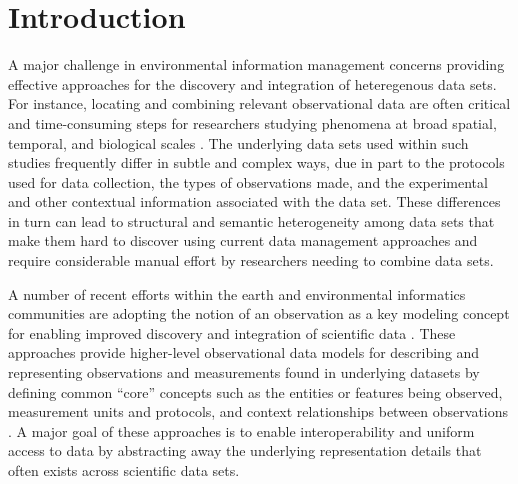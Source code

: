 
\section{Introduction}
\label{sec-intro}

A major challenge in environmental information management concerns
providing effective approaches for the discovery and integration of
heteregenous data sets. For instance, locating and combining relevant
observational data are often critical and time-consuming steps for
researchers studying phenomena at broad spatial, temporal, and
biological scales
\cite{worm06:_impac_of_biodiv_loss_ocean_ecosy_servic,pennings05:_do,green05:_compl_in_ecolog_and_conser,sorokina09:_detec_inter_variab_inter_obser_ornit_data,jackson01:_histor_overf_and_recen_collap}. The
underlying data sets used within such studies frequently differ in
subtle and complex ways, due in part to the protocols used for data
collection, the types of observations made, and the experimental and
other contextual information associated with the data set. These
differences in turn can lead to structural and semantic heterogeneity
among data sets that make them hard to discover using current data
management approaches and require considerable manual effort by
researchers needing to combine data sets.

A number of recent efforts within the earth and environmental
informatics communities are adopting the notion of an observation as a
key modeling concept for enabling improved discovery and integration
of scientific data
\cite{om,fox09:_ontol,tarboton07:_cuahs_commun_obser_data_model,cushing07:_compon_based_end_user_datab,balhoff10:_phenex,bowers08}. These
approaches provide higher-level observational data models for
describing and representing observations and measurements found in
underlying datasets by defining common ``core'' concepts such as the
entities or features being observed, measurement units and protocols,
and context relationships between observations \cite{om,bowers08}.  A
major goal of these approaches is to enable interoperability and
uniform access to data by abstracting away the underlying
representation details that often exists across scientific data sets.

